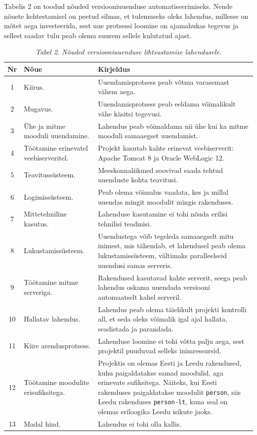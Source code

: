 \documentclass[12pt]{article}
\newcommand{\code}[1]{\texttt{#1}}
\begin{document}
  Tabelis 2 on toodud nõuded versiooniuuenduse automatiseerimiseks. Nende nõuete kehtestamisel on peetud silmas, et tulemuseks oleks lahendus, millesse on mõtet aega investeerida, sest uue protsessi loomine on ajamahukas tegevus ja sellest saadav tulu peab olema suurem sellele kulutatud ajast.
  
  \begin{table}[H]
    \caption*{\textit{Tabel 2. Nõuded versiooniuuenduse lihtsustamise lahendusele.}}
    
    \begin{tabular}{|c|p{3.5cm}|p{9cm}|}
      \hline
      \textbf{Nr} & \textbf{Nõue} & \textbf{Kirjeldus}\\
      \hline
      1 & Kiirus. & Uuendamisprotsess peab võtma varasemast vähem aega.\\
      \hline
      2 & Mugavus. & Uuendamisprotsess peab eeldama võimalikult vähe käsitsi tegevusi.\\
      \hline
      3 & Ühe ja mitme mooduli uuendamine. & Lahendus peab võimaldama nii ühe kui ka mitme mooduli samaaegset uuendamist.\\
      \hline
      4 & Töötamine erinevatel veebiserveritel. & Projekt kasutab kahte erinevat veebiserverit: Apache Tomcat 8 ja Oracle WebLogic 12.\\
      \hline
      5 & Teavitussüsteem. & Meeskonnaliikmed soovivad saada tehtud uuenduste kohta teavitusi.\\
      \hline
      6 & Logimissüsteem. & Peab olema võimalus vaadata, kes ja millal uuendas mingit moodulit mingis rakenduses.\\
      \hline
      7 & Mittetehniline kasutus. & Lahenduse kasutamine ei tohi nõuda erilisi tehnilisi teadmisi.\\
      \hline
      8 & Lukustamissüsteem. & Uuendustega võib tegeleda samaaegselt mitu inimest, mis tähendab, et lahendusel peab olema lukustamissüsteem, vältimaks paralleelseid uuendusi samas serveris.\\
      \hline
      9 & Töötamine mitme serveriga. & Rakendused kasutavad kahte serverit, seega peab lahendus oskama uuendada versiooni automaatselt kahel serveril.\\
      \hline
      10 & Hallatav lahendus. & Lahendus peab olema täielikult projekti kontrolli all, et seda oleks võimalik igal ajal hallata, seadistada ja parandada.\\
      \hline
      11 & Kiire arendusprotsess. & Lahenduse loomine ei tohi võtta palju aega, sest projektil puuduvad selleks inimressursid.\\
      \hline
      12 & Töötamine moodulite erisufiksitega. & Projektis on olemas Eesti ja Leedu rakendused, kuhu paigaldatakse samad moodulid, aga erinevate sufiksitega. Näiteks, kui Eesti rakenduses paigaldatakse moodulit \code{person}, siis Leedu rakenduses \code{person-lt}, kuna seal on olemas eriloogika Leedu isikute jaoks.\\
      \hline
      13 & Madal hind. & Lahendus ei tohi olla kallis.\\
      \hline
    \end{tabular}
  \end{table}
  
\end{document}
